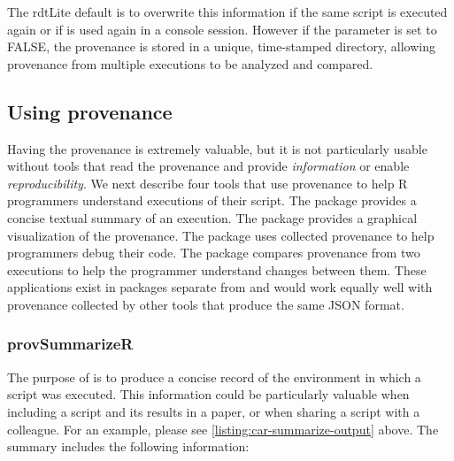 The rdtLite default is to overwrite this information if the same script is executed again or if  is used again in a console session. However if the  parameter is set to FALSE, the provenance is stored in a unique, time-stamped directory, allowing provenance from multiple executions to be analyzed and compared.

\subsection{Using provenance}
Having the provenance is extremely valuable, but it is not particularly usable without tools that read the provenance and provide \emph{information} or enable \emph{reproducibility}.  We next describe four tools that use provenance to help R programmers understand executions of their script.  The  package provides a concise textual summary of an execution.  The  package provides a graphical visualization of the provenance.  The  package uses collected provenance to help programmers debug their code.  The  package compares provenance from two executions to help the programmer understand changes between them. These applications exist in packages separate from  and would work equally well with provenance collected by other tools that produce the same JSON format.  



\subsubsection{provSummarizeR}

The purpose of  is to produce a concise record of the environment in which a script was executed.  This information could be particularly valuable when including a script and its results in a paper, or when sharing a script with a colleague. For an example, please see \autoref{listing:car-summarize-output} above. The summary includes the following information:

%

